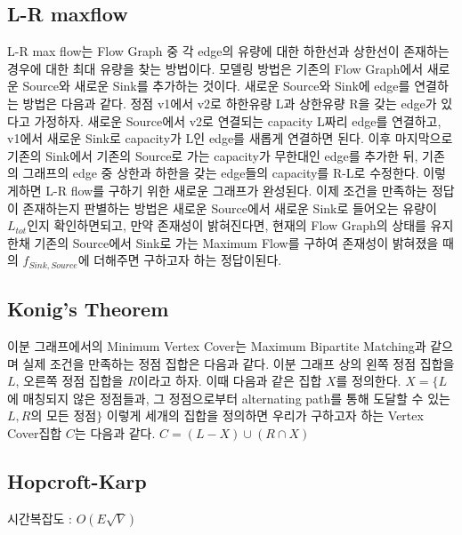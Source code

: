 \documentclass[10pt,landscape,a4paper,twocolumn]{article}
\begin{document}
\subsection{L-R maxflow}
\hspace{1em}L-R max flow는 Flow Graph 중 각 edge의 유량에 대한 하한선과 상한선이 존재하는 경우에 대한 최대 유량을 찾는 방법이다. 모델링 방법은 기존의 Flow Graph에서 새로운 Source와 새로운 Sink를 추가하는 것이다. 새로운 Source와 Sink에 edge를 연결하는 방법은 다음과 같다. 정점 v1에서 v2로 하한유량 L과 상한유량 R을 갖는 edge가 있다고 가정하자. 새로운 Source에서 v2로 연결되는 capacity L짜리 edge를 연결하고, v1에서 새로운 Sink로 capacity가 L인 edge를 새롭게 연결하면 된다. 이후 마지막으로 기존의 Sink에서 기존의 Source로 가는 capacity가 무한대인 edge를 추가한 뒤, 기존의 그래프의 edge 중 상한과 하한을 갖는 edge들의 capacity를 R-L로 수정한다. 이렇게하면 L-R flow를 구하기 위한 새로운 그래프가 완성된다. 이제 조건을 만족하는 정답이 존재하는지 판별하는 방법은 새로운 Source에서 새로운 Sink로 들어오는 유량이 $L_{tot}$인지 확인하면되고, 만약 존재성이 밝혀진다면, 현재의 Flow Graph의 상태를 유지한채 기존의 Source에서 Sink로 가는 Maximum Flow를 구하여 존재성이 밝혀졌을 때의 $f_{Sink,Source}$에 더해주면 구하고자 하는 정답이된다.

\subsection{Konig's Theorem}
\hspace{1em}이분 그래프에서의 Minimum Vertex Cover는 Maximum Bipartite Matching과 같으며 실제 조건을 만족하는 정점 집합은 다음과 같다. 이분 그래프 상의 왼쪽 정점 집합을 $L$, 오른쪽 정점 집합을 $R$이라고 하자. 이때 다음과 같은 집합 $X$를 정의한다. $X=\{L$에 매칭되지 않은 정점들과, 그 정점으로부터 alternating path를 통해 도달할 수 있는 $L, R$의 모든 정점$\}$ 이렇게 세개의 집합을 정의하면 우리가 구하고자 하는 Vertex Cover집합 $C$는 다음과 같다. $C=(L-X)\cup{(R\cap{X})}$\\

%

\subsection{Hopcroft-Karp}
시간복잡도 : $O(E\sqrt{V})$

\end{document}
